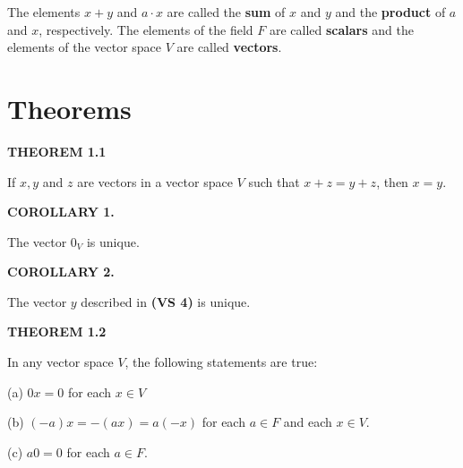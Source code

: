 \documentclass[12pt, a4paper]{article}
\begin{document}
 \vspace{4mm}
 
 \noindent The elements $x+y$ and $a\cdot x$ are called the \textbf{sum} of $x$ and $y$ and the \textbf{product} of $a$ and $x$, respectively. The elements of the field $F$ are called \textbf{scalars} and the elements of the vector space $V$ are called \textbf{vectors}.
 
 \newpage
 
 \section{Theorems}
 
 \noindent\blacksquare\textbf{ THEOREM 1.1}\par
 
 \vspace{2mm}
 
 If $x,y$ and $z$ are vectors in a vector space $V$ such that $x+z=y+z$, then $x=y$.
 
 \vspace{4mm}
 
 \noindent\blacktriangle\textbf{ COROLLARY 1.}\par
 
 \vspace{2mm}
 
 The vector $0_V$ is unique.
 
 \vspace{4mm}
 
 \noindent\blacktriangle\textbf{ COROLLARY 2.}\par
 
 \vspace{2mm}
 
 The vector $y$ described in \textbf{(VS 4)} is unique.
 
 \vspace{4mm}
 
 \noindent\blacksquare\textbf{ THEOREM 1.2}\par
 
 \vspace{2mm}
 
 In any vector space $V$, the following statements are true:
 
 \vspace{2mm}
 
 \begin{addmargin}[1.5em]{1.5em}
 
 \par
 
    (a) $0x=0$ for each $x\in V$\par
    \noindent(b) $(-a)x=-(ax)=a(-x)$ for each $a\in F$ and each $x\in V$.\par
    \noindent(c) $a0=0$ for each $a\in F$.
 
 \end{addmargin}
 
\end{document}
